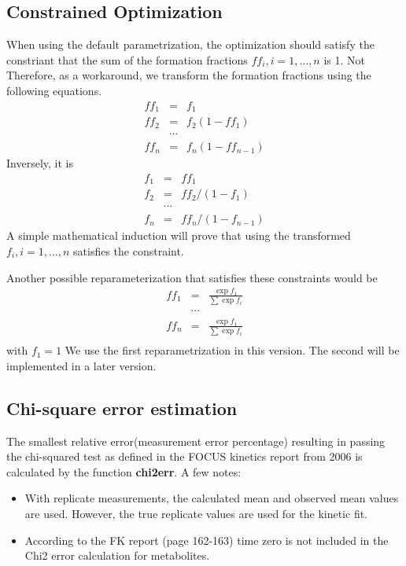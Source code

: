 \documentclass{article}
\begin{document}
\subsection{Constrained Optimization}
When using the default parametrization, the optimization should
satisfy the constriant that the sum of the formation fractions $ff_i, i=1,\ldots, n$ is 1. Not
Therefore, as a workaround, we transform the formation fractions using
the following equations.
\begin{eqnarray*}
  ff_1 &=& f_1\\
  ff_2 &=& f_2(1-ff_1)\\
  &\cdots&\\
  ff_n&=&f_n(1-ff_{n-1})
\end{eqnarray*}
Inversely, it is
\begin{eqnarray*}
  f_1 &=& ff_1\\
  f_2 &=& ff_2/(1-f_1)\\
  &\cdots&\\
  f_n&=&ff_n/(1-f_{n-1})
\end{eqnarray*}
A simple mathematical induction will prove that using the transformed
$f_i, i=1,\ldots,n$ satisfies the constraint.

Another possible reparameterization that satisfies these constraints would be
\begin{eqnarray*}
  ff_1 &=& \frac{\exp{f_1}}{\sum\exp{f_i}}\\
  &\cdots&\\
  ff_n&=&\frac{\exp{f_1}}{\sum\exp{f_i}}\\
\end{eqnarray*} with $f_1=1$
We use the first reparametrization in this version. The second will be
implemented in a later version.
\subsection{Chi-square error estimation}
The smallest relative error(measurement error percentage) resulting in
passing the chi-squared test
as defined in the FOCUS kinetics report from 2006 is calculated by the
function \textbf{chi2err}. A few notes:
\begin{itemize}
  \item With replicate measurements, the calculated mean and observed
    mean values are used. However,  the true replicate values are
    used for the kinetic fit.
\item According to the FK report (page 162-163) time zero is not
included in the Chi2 error calculation for metabolites.
\end{itemize}
\end{document}
